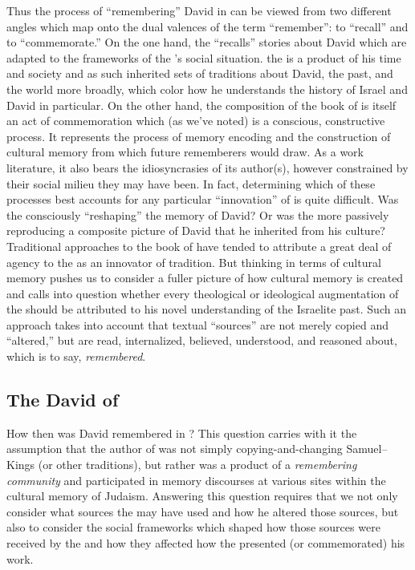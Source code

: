 Thus the process of ``remembering'' David in \chronicles can be viewed from two different angles which map onto the dual valences of the term ``remember'': to ``recall'' and to ``commemorate.'' On the one hand, the \chronicler ``recalls'' stories about David which are adapted to the frameworks of the \chronicler's social situation. the \chronicler is a product of his time and society and as such inherited sets of traditions about David, the past, and the world more broadly, which color how he understands the history of Israel and David in particular. On the other hand, the composition of the book of \chronicles is itself an act of commemoration which (as we've noted) is a conscious, constructive process. It represents the process of memory encoding and the construction of cultural memory from which future rememberers would draw. As a work literature, it also bears the idiosyncrasies of its author(s), however constrained by their social milieu they may have been. In fact, determining which of these processes best accounts for any particular ``innovation'' of \chronicles is quite difficult. Was the \chronicler consciously ``reshaping'' the memory of David? Or was the \chronicler more passively reproducing a composite picture of David that he inherited from his culture? Traditional approaches to the book of \chronicles have tended to attribute a great deal of agency to the \chronicler as an innovator of tradition. But thinking in terms of cultural memory pushes us to consider a fuller picture of how cultural memory is created and calls into question whether every theological or ideological augmentation of the \chronicler should be attributed to his novel understanding of the Israelite past. Such an approach takes into account that textual ``sources'' are not merely copied and ``altered,'' but are read, internalized, believed, understood, and reasoned about, which is to say, \emph{remembered}.

\subsection{The David of \chronicles}
How then was David remembered in \chronicles? This question carries with it the assumption that the author of \chronicles was not simply copying-and-changing Samuel--Kings (or other traditions), but rather was a product of a \emph{remembering community} and participated in memory discourses at various sites within the cultural memory of \secondtemple Judaism. Answering this question requires that we not only consider what sources the \chronicler may have used and how he altered those sources, but also to consider the social frameworks which shaped how those sources were received by the \chronicler and how they affected how the \chronicler presented (or commemorated) his work.


